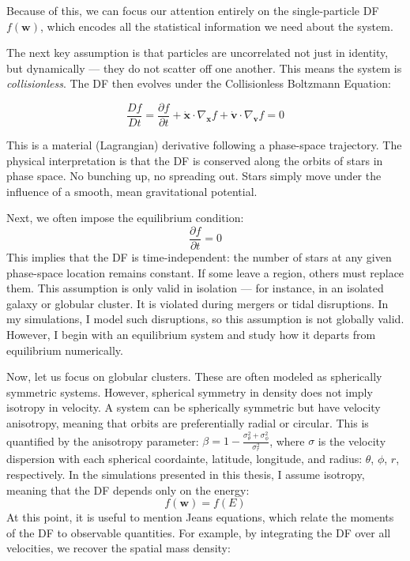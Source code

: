         Because of this, we can focus our attention entirely on the single-particle DF \( f(\mathbf{w}) \), which encodes all the statistical information we need about the system.

        The next key assumption is that particles are uncorrelated not just in identity, but dynamically — they do not scatter off one another. This means the system is \textit{collisionless}. The DF then evolves under the Collisionless Boltzmann Equation:

        \begin{equation}
        \frac{Df}{Dt} = \frac{\partial f}{\partial t} + \dot{\mathbf{x}} \cdot \nabla_{\mathbf{x}} f + \dot{\mathbf{v}} \cdot \nabla_{\mathbf{v}} f = 0
        \end{equation}

        This is a material (Lagrangian) derivative following a phase-space trajectory. The physical interpretation is that the DF is conserved along the orbits of stars in phase space. No bunching up, no spreading out. Stars simply move under the influence of a smooth, mean gravitational potential.

        Next, we often impose the equilibrium condition:
        \[
        \frac{\partial f}{\partial t} = 0
        \]
        This implies that the DF is time-independent: the number of stars at any given phase-space location remains constant. If some leave a region, others must replace them. This assumption is only valid in isolation — for instance, in an isolated galaxy or globular cluster. It is violated during mergers or tidal disruptions. In my simulations, I model such disruptions, so this assumption is not globally valid. However, I begin with an equilibrium system and study how it departs from equilibrium numerically.

        Now, let us focus on globular clusters. These are often modeled as spherically symmetric systems. However, spherical symmetry in density does not imply isotropy in velocity. A system can be spherically symmetric but have velocity anisotropy, meaning that orbits are preferentially radial or circular. This is quantified by the anisotropy parameter: \( \beta = 1 - \frac{\sigma^2_\theta + \sigma^2_\phi}{\sigma^2_r} \), where $\sigma$ is the velocity dispersion with each spherical coordainte, latitude, longitude, and radius: $\theta$, $\phi$, $r$, respectively. In the simulations presented in this thesis, I assume isotropy, meaning that the DF depends only on the energy:
        \[
        f(\mathbf{w}) = f(E)
        \]
        At this point, it is useful to mention Jeans equations, which relate the moments of the DF to observable quantities. For example, by integrating the DF over all velocities, we recover the spatial mass density:

